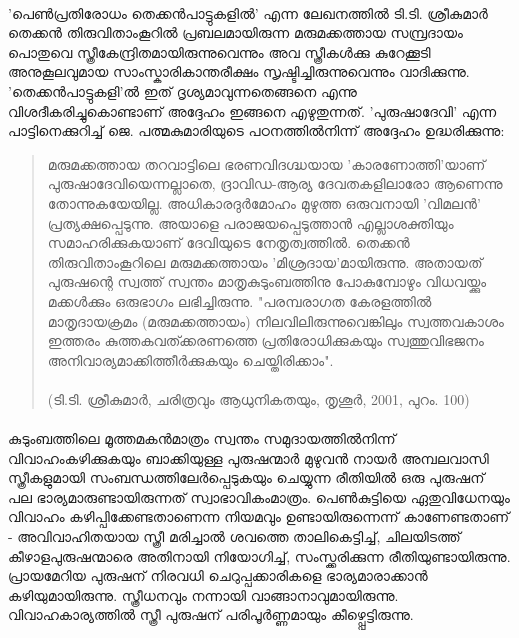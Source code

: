 \label{ch2box3} %
\begin{tcolorbox}[%
  breakable, %
  arc=0mm, 
  left=1pt, right = 1pt, 
  boxrule=0mm,
  colback = {blue!10}, %
] 

\paragraph{}'പെൺപ്രതിരോധം തെക്കൻപാട്ടുകളിൽ' എന്ന ലേഖനത്തിൽ ടി.ടി. ശ്രീകുമാർ തെക്കൻ തിരുവിതാംകൂറിൽ പ്രബലമായിരുന്ന മരുമക്കത്തായ സമ്പ്രദായം പൊതുവെ സ്ത്രീകേന്ദ്രിതമായിരുന്നുവെന്നും അവ സ്ത്രീകൾക്കു കുറേക്കൂടി അനുകൂലവുമായ സാംസ്കാരികാന്തരീക്ഷം സൃഷ്ടിച്ചിരുന്നുവെന്നും വാദിക്കുന്നു. 'തെക്കൻപാട്ടുകളി'ൽ ഇത് ദൃശ്യമാവുന്നതെങ്ങനെ എന്നു വിശദീകരിച്ചുകൊണ്ടാണ് അദ്ദേഹം ഇങ്ങനെ എഴുതുന്നത്. 'പുരുഷാദേവി' എന്ന പാട്ടിനെക്കുറിച്ച് ജെ. പത്മകുമാരിയുടെ പഠനത്തിൽനിന്ന് അദ്ദേഹം ഉദ്ധരിക്കുന്നു:
\begin{quotation}
\noindent മരുമക്കത്തായ തറവാട്ടിലെ ഭരണവിദഗ്ദ്ധയായ 'കാരണോത്തി'യാണ് പുരുഷാദേവിയെന്നല്ലാതെ, ദ്രാവിഡ-ആര്യ ദേവതകളിലാരോ ആണെന്നു തോന്നുകയേയില്ല. അധികാരദുർമോഹം മുഴുത്ത ഒരുവനായി 'വിമലൻ' പ്രത്യക്ഷപ്പെടുന്നു. അയാളെ പരാജയപ്പെടുത്താൻ എല്ലാശക്തിയും സമാഹരിക്കുകയാണ് ദേവിയുടെ നേതൃത്വത്തിൽ. തെക്കൻ തിരുവിതാംകൂറിലെ മരുമക്കത്തായം 'മിശ്രദായ'മായിരുന്നു. അതായത് പുരുഷന്റെ സ്വത്ത് സ്വന്തം മാതൃകുടുംബത്തിനു പോകുമ്പോഴും വിധവയ്ക്കും മക്കൾക്കും ഒരുഭാഗം ലഭിച്ചിരുന്നു. "പരമ്പരാഗത കേരളത്തിൽ മാതൃദായക്രമം (മരുമക്കത്തായം) നിലവിലിരുന്നുവെങ്കിലും സ്വത്തവകാശം ഇത്തരം കുത്തകവത്ക്കരണത്തെ പ്രതിരോധിക്കുകയും സ്വത്തുവിഭജനം അനിവാര്യമാക്കിത്തീർക്കുകയും ചെയ്തിരിക്കാം".\\ 
\\(ടി.ടി. ശ്രീകുമാർ, ചരിത്രവും ആധുനികതയും, തൃശൂർ, 2001, പുറം. 100)
 \end{quotation}

\end{tcolorbox}

\paragraph{}കുടുംബത്തിലെ മൂത്തമകൻമാത്രം സ്വന്തം സമുദായത്തിൽനിന്ന് വിവാഹംകഴിക്കുകയും ബാക്കിയുള്ള പുരുഷന്മാർ മുഴുവൻ നായർ അമ്പലവാസി സ്ത്രീകളുമായി സംബന്ധത്തിലേർപ്പെടുകയും ചെയ്യുന്ന രീതിയിൽ ഒരു പുരുഷന് പല ഭാര്യമാരുണ്ടായിരുന്നത് സ്വാഭാവികംമാത്രം. പെൺകുട്ടിയെ ഏതുവിധേനയും വിവാഹം കഴിപ്പിക്കേണ്ടതാണെന്ന നിയമവും ഉണ്ടായിരുന്നെന്ന് കാണേണ്ടതാണ് - അവിവാഹിതയായ സ്ത്രീ മരിച്ചാൽ ശവത്തെ താലികെട്ടിച്ച്, ചിലയിടത്ത് കീഴാളപുരുഷന്മാരെ അതിനായി നിയോഗിച്ച്, സംസ്ക്കരിക്കുന്ന രീതിയുണ്ടായിരുന്നു. പ്രായമേറിയ പുരുഷന് നിരവധി ചെറുപ്പക്കാരികളെ ഭാര്യമാരാക്കാൻ കഴിയുമായിരുന്നു. സ്ത്രീധനവും നന്നായി വാങ്ങാനാവുമായിരുന്നു. വിവാഹകാര്യത്തിൽ സ്ത്രീ പുരുഷന് പരിപൂർണ്ണമായും കീഴ്പ്പെട്ടിരുന്നു.

